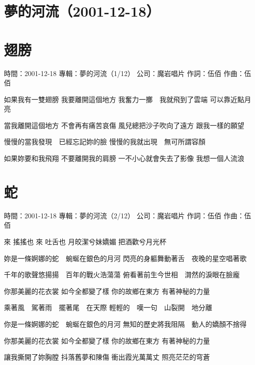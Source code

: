 \documentclass[UTF8,a4paper,oneside,twocolumn,12pt]{ctexbook}
\newcommand{\infopair}[2]{\textbullet #1：#2}
\newcommand{\zc}[1][伍佰]{\infopair{作詞}{#1}}
\newcommand{\zq}[1][伍佰]{\infopair{作曲}{#1}}
\newcommand{\zj}[1]{\infopair{專輯}{#1}}
\newcommand{\sj}[1]{\infopair{時間}{#1}}
\newcommand{\gs}[1]{\infopair{公司}{#1}}
\newenvironment{info}{\begin{flushleft}\kaishu
	}
	{\end{flushleft}\normalsize\yahei\par}
\newenvironment{lyric}{
	}
{}
\begin{document}
\section*{夢的河流（2001-12-18）}

\section{翅膀}
\begin{info}
	\sj{2001-12-18}
	\zj{夢的河流（1/12）}
	\gs{魔岩唱片}
	\zc
	\zq
\end{info}
\begin{lyric}
	如果我有一雙翅膀
	我要離開這個地方
	我奮力一擲　我就飛到了雲端
	可以靠近點月亮

	當我離開這個地方
	不會再有痛苦哀傷
	風兒總把沙子吹向了遠方
	跟我一樣的願望

	慢慢的當我發現　已經忘記妳的臉
	慢慢的我就出現　無可所謂容顏

	如果妳要和我飛翔
	不要離開我的肩膀
	一不小心就會失去了影像
	我想一個人流浪
\end{lyric}

\section{蛇}
\begin{info}
	\sj{2001-12-18}
	\zj{夢的河流（2/12）}
	\gs{魔岩唱片}
	\zc
	\zq
\end{info}
\begin{lyric}
	來 搖搖也
	來 吐舌也
	月皎潔兮妹嬌媚
	把酒歡兮月光杯

	妳是一條婀娜的蛇　蜿蜒在銀色的月河
	閃亮的身軀舞動著舌　夜晚的星空唱著歌

	千年的歌聲悠揚揚　百年的戰火浩蕩蕩
	俯看著前生今世相　潸然的淚眼在臉龐

	你那美麗的花衣裳
	如今全都變了樣
	你的故鄉在東方
	有著神秘的力量

	乘著風　駕著雨　擺著尾　在天際
	輕輕的　嘆一句　山裂開　地分離

	你是一條婀娜的蛇　蜿蜒在銀色的月河
	無知的歷史將我阻隔　動人的嬌顏不捨得

	你那美麗的花衣裳
	如今全都變了樣
	你的故鄉在東方
	有著神秘的力量

	讓我撕開了妳胸膛
	抖落舊夢和陳傷
	衝出霞光萬萬丈
	照亮茫茫的穹蒼
\end{lyric}
\end{document}

